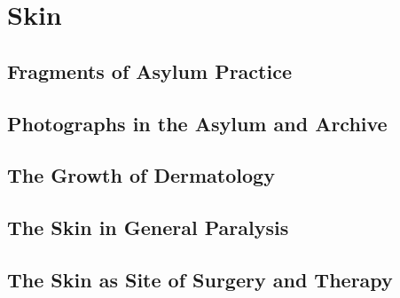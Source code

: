 \documentclass[
  openany]{book}
\begin{document}
\hypertarget{skin}{%
\chapter{Skin}\label{skin}}

\hypertarget{fragments-of-asylum-practice}{%
\section{Fragments of Asylum Practice}\label{fragments-of-asylum-practice}}

\hypertarget{photographs-in-the-asylum-and-archive}{%
\section{Photographs in the Asylum and Archive}\label{photographs-in-the-asylum-and-archive}}

\hypertarget{the-growth-of-dermatology}{%
\section{The Growth of Dermatology}\label{the-growth-of-dermatology}}

\hypertarget{the-skin-in-general-paralysis}{%
\section{The Skin in General Paralysis}\label{the-skin-in-general-paralysis}}

\hypertarget{the-skin-as-site-of-surgery-and-therapy}{%
\section{The Skin as Site of Surgery and Therapy}\label{the-skin-as-site-of-surgery-and-therapy}}
\end{document}
